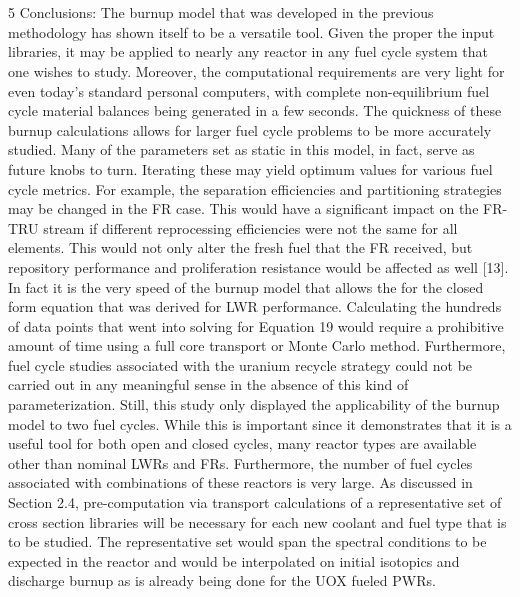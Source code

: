 \section{}
\label{1g_sec:}
5 Conclusions:
The burnup model that was developed in the previous methodology has shown itself to be a versatile tool.  Given the proper the input libraries, it may be applied to nearly any reactor in any fuel cycle system that one wishes to study.  Moreover, the computational requirements are very light for even today’s standard personal computers, with complete non-equilibrium fuel cycle material balances being generated in a few seconds.   
The quickness of these burnup calculations allows for larger fuel cycle problems to be more accurately studied.  Many of the parameters set as static in this model, in fact, serve as future knobs to turn.  Iterating these may yield optimum values for various fuel cycle metrics.  For example, the separation efficiencies and partitioning strategies may be changed in the FR case.  This would have a significant impact on the FR-TRU stream if different reprocessing efficiencies were not the same for all elements.  This would not only alter the fresh fuel that the FR received, but repository performance and proliferation resistance would be affected as well [13].  
In fact it is the very speed of the burnup model that allows the for the closed form equation that was derived for LWR performance.  Calculating the hundreds of data points that went into solving for Equation 19 would require a prohibitive amount of time using a full core transport or Monte Carlo method.  Furthermore, fuel cycle studies associated with the uranium recycle strategy could not be carried out in any meaningful sense in the absence of this kind of parameterization.
Still, this study only displayed the applicability of the burnup model to two fuel cycles.  While this is important since it demonstrates that it is a useful tool for both open and closed cycles, many reactor types are available other than nominal LWRs and FRs.  Furthermore, the number of fuel cycles associated with combinations of these reactors is very large.  As discussed in Section 2.4, pre-computation via transport calculations of a representative set of cross section libraries will be necessary for each new coolant and fuel type that is to be studied.  The representative set would span the spectral conditions to be expected in the reactor and would be interpolated on initial isotopics and discharge burnup as is already being done for the UOX fueled PWRs.
